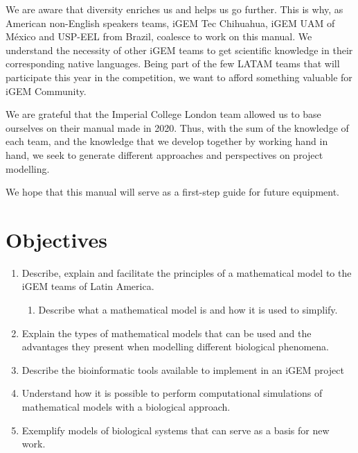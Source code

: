 \documentclass[11pt, letterpaper, english]{article}
\begin{document}
\par{We are aware that diversity enriches us and helps us go further. This is why, as American non-English speakers teams, iGEM Tec Chihuahua, iGEM UAM of México and USP-EEL from Brazil, coalesce to work on this manual. We understand the necessity of other iGEM teams to get scientific knowledge in their corresponding native languages. Being part of the few LATAM teams that will participate this year in the competition, we want to afford something valuable for iGEM Community.

We are grateful that the Imperial College London team allowed us to base ourselves on their manual made in 2020.
Thus, with the sum of the knowledge of each team, and the knowledge that we develop together by working hand in hand, we seek to generate different approaches and perspectives on project modelling.}

\par{We hope that this manual will serve as a first-step guide for future equipment.}



\section{Objectives}

\begin{enumerate}
    \item Describe, explain and facilitate the principles of a mathematical model to the iGEM teams of Latin America. 
        \begin{enumerate}
            \item  Describe what a mathematical model is and how it is used to simplify.
        \end{enumerate}
    \item Explain the types of mathematical models that  can be used and the advantages they present when modelling different biological phenomena.
    \item Describe the bioinformatic tools available to implement in an iGEM project
    \item Understand how it is possible to perform computational simulations of mathematical models with a biological approach.
    \item Exemplify models of biological systems that can serve as a basis for new work.
    
\end{enumerate}

\newpage
\end{document}
